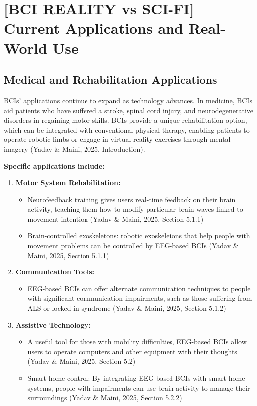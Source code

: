 \documentclass[12pt]{article}
\begin{document}
\section{[BCI REALITY vs SCI-FI] Current Applications and Real-World Use}

\subsection{Medical and Rehabilitation Applications}

BCIs' applications continue to expand as technology advances. In medicine, BCIs aid patients who have suffered a stroke, spinal cord injury, and neurodegenerative disorders in regaining motor skills. BCIs provide a unique rehabilitation option, which can be integrated with conventional physical therapy, enabling patients to operate robotic limbs or engage in virtual reality exercises through mental imagery (Yadav \& Maini, 2025, Introduction).

\textbf{Specific applications include:}

\begin{enumerate}
    \item \textbf{Motor System Rehabilitation:}
    \begin{itemize}
        \item Neurofeedback training gives users real-time feedback on their brain activity, teaching them how to modify particular brain waves linked to movement intention (Yadav \& Maini, 2025, Section 5.1.1)
        \item Brain-controlled exoskeletons: robotic exoskeletons that help people with movement problems can be controlled by EEG-based BCIs (Yadav \& Maini, 2025, Section 5.1.1)
    \end{itemize}
    
    \item \textbf{Communication Tools:}
    \begin{itemize}
        \item EEG-based BCIs can offer alternate communication techniques to people with significant communication impairments, such as those suffering from ALS or locked-in syndrome (Yadav \& Maini, 2025, Section 5.1.2)
    \end{itemize}
    
    \item \textbf{Assistive Technology:}
    \begin{itemize}
        \item A useful tool for those with mobility difficulties, EEG-based BCIs allow users to operate computers and other equipment with their thoughts (Yadav \& Maini, 2025, Section 5.2)
        \item Smart home control: By integrating EEG-based BCIs with smart home systems, people with impairments can use brain activity to manage their surroundings (Yadav \& Maini, 2025, Section 5.2.2)
    \end{itemize}
\end{enumerate}
\end{document}

